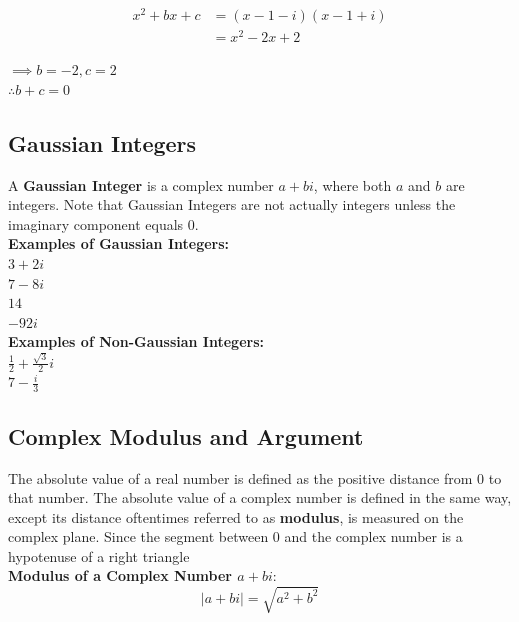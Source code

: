         \begin{align*}
            x^2+bx+c &= (x-1-i)(x-1+i) \\
            &= x^2-2x+2
        \end{align*}

        \noindent $\implies b=-2,c=2$ \\
        $\therefore b+c=0$



    \subsection{Gaussian Integers}
        A \textbf{Gaussian Integer} is a complex number $a+bi$, where both $a$ and $b$ are integers.
        Note that Gaussian Integers are not actually integers unless the imaginary component equals 0. \\

        \noindent \textbf{Examples of Gaussian Integers:} \\
        $3+2i$ \\
        $7-8i$ \\
        $14$ \\
        $-92i$ \\
        \noindent \textbf{Examples of Non-Gaussian Integers:} \\
        $\frac{1}{2}+\frac{\sqrt{3}}{2}i$ \\
        $7-\frac{i}{3}$



    \subsection{Complex Modulus and Argument}

        The absolute value of a real number is defined as the positive distance from 0 to that
        number. The absolute value of a complex number is defined in the same way, except its
        distance oftentimes referred to as \textbf{modulus}, is measured on the complex plane.
        Since the segment between 0 and the complex number is a hypotenuse of a right triangle \\

        \noindent \textbf{Modulus of a Complex Number $a+bi$}: \\

        \begin{equation*}
            |a+bi| = \sqrt{a^2+b^2}
        \end{equation*}

